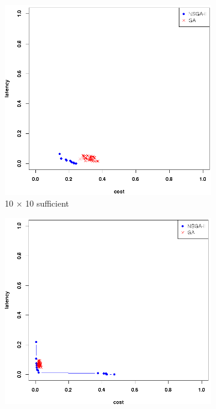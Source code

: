 \documentclass{llncs}
\begin{document}
\begin{figure}[H]
	\centering
	\begin{subfigure}[b]{0.45\textwidth}
		\includegraphics[width=\textwidth]{pics/pop_50_gen_50_10_times_10_suff.png}
		\caption{10 $\times$ 10 sufficient}
	\end{subfigure}%
	\begin{subfigure}[b]{0.45\textwidth}
		\includegraphics[width=\textwidth]{pics/pop_50_gen_50_10_times_10_minimum.png}

\end{subfigure}
\end{figure}
\end{document}
